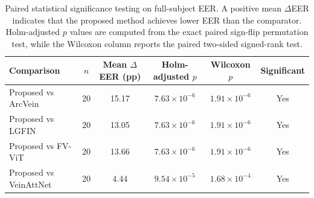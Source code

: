 \begin{table}[ht!]
    \centering
    \begin{tabular}{|l|c|c|c|c|c|}
        \hline
        Comparison & $n$ & Mean $\Delta$EER (pp) & Holm-adjusted $p$ & Wilcoxon $p$ & Significant \\
        \hline
        Proposed vs ArcVein & 20 & 15.17 & $7.63 \times 10^{-6}$ & $1.91 \times 10^{-6}$ & Yes \\
        Proposed vs LGFIN & 20 & 13.05 & $7.63 \times 10^{-6}$ & $1.91 \times 10^{-6}$ & Yes \\
        Proposed vs FV-ViT & 20 & 13.66 & $7.63 \times 10^{-6}$ & $1.91 \times 10^{-6}$ & Yes \\
        Proposed vs VeinAttNet & 20 & 4.44 & $9.54 \times 10^{-5}$ & $1.68 \times 10^{-4}$ & Yes \\
        \hline
    \end{tabular}
    \caption{Paired statistical significance testing on full-subject EER. A positive mean $\Delta$EER indicates that the proposed method achieves lower EER than the comparator. Holm-adjusted $p$ values are computed from the exact paired sign-flip permutation test, while the Wilcoxon column reports the paired two-sided signed-rank test.}
    \label{tab:statistical_significance}
\end{table}
